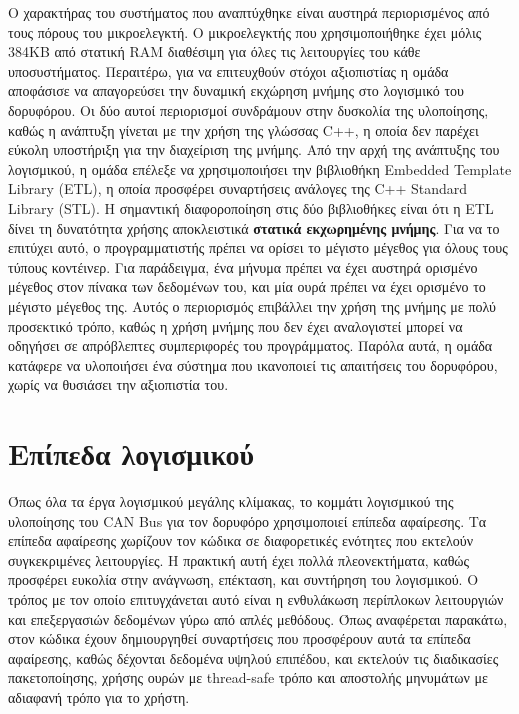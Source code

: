 \documentclass[a4paper,nobib,justified]{tufte-book}
\begin{document}
Ο χαρακτήρας του συστήματος που αναπτύχθηκε είναι αυστηρά περιορισμένος από τους πόρους του μικροελεγκτή. Ο μικροελεγκτής που χρησιμοποιήθηκε έχει μόλις 384KB από στατική RAM διαθέσιμη για όλες τις λειτουργίες του κάθε υποσυστήματος. Περαιτέρω, για να επιτευχθούν στόχοι αξιοπιστίας η ομάδα αποφάσισε να απαγορεύσει την δυναμική εκχώρηση μνήμης στο λογισμικό του δορυφόρου. Οι δύο αυτοί περιορισμοί συνδράμουν στην δυσκολία της υλοποίησης, καθώς η ανάπτυξη γίνεται με την χρήση της γλώσσας C++, η οποία δεν παρέχει εύκολη υποστήριξη για την διαχείριση της μνήμης. Από την αρχή της ανάπτυξης του λογισμικού, η ομάδα επέλεξε να χρησιμοποιήσει την βιβλιοθήκη Embedded Template Library (ETL), η οποία προσφέρει συναρτήσεις ανάλογες της C++ Standard Library (STL). Η σημαντική διαφοροποίηση στις δύο βιβλιοθήκες είναι ότι η ETL δίνει τη δυνατότητα χρήσης αποκλειστικά \textbf{στατικά εκχωρημένης μνήμης}. Για να το επιτύχει αυτό, ο προγραμματιστής πρέπει να ορίσει το μέγιστο μέγεθος για όλους τους τύπους κοντέινερ. Για παράδειγμα, ένα μήνυμα πρέπει να έχει αυστηρά ορισμένο μέγεθος στον πίνακα των δεδομένων του, και μία ουρά πρέπει να έχει ορισμένο το μέγιστο μέγεθος της. Αυτός ο περιορισμός επιβάλλει την χρήση της μνήμης με πολύ προσεκτικό τρόπο, καθώς η χρήση μνήμης που δεν έχει αναλογιστεί μπορεί να οδηγήσει σε απρόβλεπτες συμπεριφορές του προγράμματος. Παρόλα αυτά, η ομάδα κατάφερε να υλοποιήσει ένα σύστημα που ικανοποιεί τις απαιτήσεις του δορυφόρου, χωρίς να θυσιάσει την αξιοπιστία του.

\section{Επίπεδα λογισμικού}
Όπως όλα τα έργα λογισμικού μεγάλης κλίμακας, το κομμάτι λογισμικού της υλοποίησης του CAN Bus για τον δορυφόρο χρησιμοποιεί επίπεδα αφαίρεσης. Τα επίπεδα αφαίρεσης χωρίζουν τον κώδικα σε διαφορετικές ενότητες που εκτελούν συγκεκριμένες λειτουργίες. Η πρακτική αυτή έχει πολλά πλεονεκτήματα, καθώς προσφέρει ευκολία στην ανάγνωση, επέκταση, και συντήρηση του λογισμικού. Ο τρόπος με τον οποίο επιτυγχάνεται αυτό είναι η ενθυλάκωση περίπλοκων λειτουργιών και επεξεργασιών δεδομένων γύρω από απλές μεθόδους. Όπως αναφέρεται παρακάτω, στον κώδικα έχουν δημιουργηθεί συναρτήσεις που προσφέρουν αυτά τα επίπεδα αφαίρεσης, καθώς δέχονται δεδομένα υψηλού επιπέδου, και εκτελούν τις διαδικασίες πακετοποίησης, χρήσης ουρών με thread-safe τρόπο και αποστολής μηνυμάτων με αδιαφανή τρόπο για το χρήστη.
\end{document}
